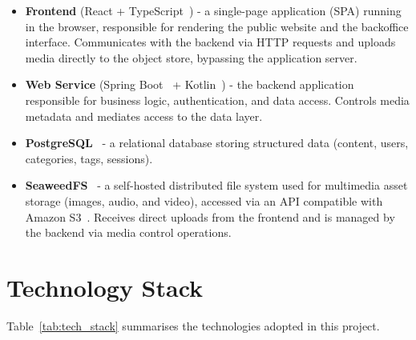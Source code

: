\begin{itemize}
      \item \textbf{Frontend} (React + TypeScript~\cite{typescript}) - a single-page application (SPA)
            running in the browser, responsible for rendering the public website and the
            backoffice interface. Communicates with the backend via HTTP requests and
            uploads media directly to the object store, bypassing the application server.

      \item \textbf{Web Service} (Spring Boot~\cite{springboot_docs} + Kotlin~\cite{kotlin}) - the backend application
            responsible for business logic, authentication, and data access. Controls media
            metadata and mediates access to the data layer.

      \item \textbf{PostgreSQL}~\cite{postgresql_docs} - a relational database storing structured data
            (content, users, categories, tags, sessions).

      \item \textbf{SeaweedFS}~\cite{seaweedfs} - a self-hosted distributed file system used for multimedia
            asset storage (images, audio, and video), accessed via an API compatible with Amazon S3~\cite{amazon_s3}. Receives
            direct uploads from the frontend and is managed by the backend via media control
            operations.
\end{itemize}

\section{Technology Stack} \label{sec:arch_stack}

Table~\ref{tab:tech_stack} summarises the technologies adopted in this project.

